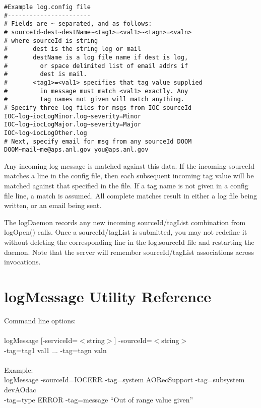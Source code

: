 \documentclass[11pt]{article}
\begin{document}
\begin{verbatim}
#Example log.config file
#-----------------------
# Fields are ~ separated, and as follows:
# sourceId~dest~destName~<tag1>=<val1>~<tagn>=<valn>
# where sourceId is string
#       dest is the string log or mail
#       destName is a log file name if dest is log,
#         or space delimited list of email addrs if
#         dest is mail.
#       <tag1>=<val1> specifies that tag value supplied
#         in message must match <val1> exactly. Any
#         tag names not given will match anything.
# Specify three log files for msgs from IOC sourceId
IOC~log~iocLogMinor.log~severity=Minor
IOC~log~iocLogMajor.log~severity=Major
IOC~log~iocLogOther.log
# Next, specify email for msg from any sourceId DOOM
DOOM~mail~me@aps.anl.gov you@aps.anl.gov
\end{verbatim}

Any incoming log message is matched against this data. If the incoming sourceId matches a line in the config file, then each subsequent incoming tag value will be matched against that specified in the file. If a tag name is not given in a config file line, a match is assumed. All complete matches result in either a log file being written, or an email being sent.

The logDaemon records any new incoming sourceId/tagList combination from logOpen() calls. Once a sourceId/tagList is submitted, you may not redefine it without deleting the corresponding line in the log.sourceId file and restarting the daemon. Note that the server will remember sourceId/tagList associations across invocations.

\section{logMessage Utility Reference}

Command line options:\\
\\
logMessage [-serviceId=$<$string$>$] -sourceId=$<$string$>$ \\
-tag=tag1 val1 ... -tag=tagn valn\\
\\
Example:\\
logMessage -sourceId=IOCERR -tag=system AORecSupport -tag=subsystem devAOdac \\
-tag=type ERROR -tag=message ``Out of range value given''
\end{document}
